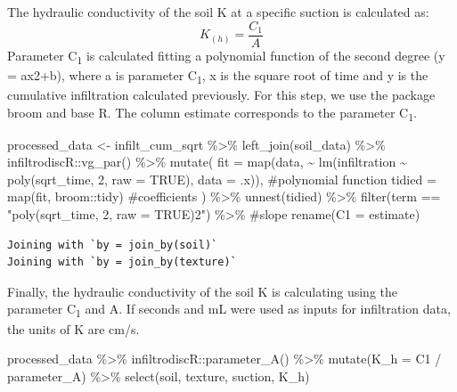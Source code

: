 \documentclass[
]{article}
\newenvironment{Shaded}{\begin{snugshade}}{\end{snugshade}}
\newcommand{\AttributeTok}[1]{\textcolor[rgb]{0.40,0.45,0.13}{#1}}
\newcommand{\CommentTok}[1]{\textcolor[rgb]{0.37,0.37,0.37}{#1}}
\newcommand{\ConstantTok}[1]{\textcolor[rgb]{0.56,0.35,0.01}{#1}}
\newcommand{\DecValTok}[1]{\textcolor[rgb]{0.68,0.00,0.00}{#1}}
\newcommand{\FunctionTok}[1]{\textcolor[rgb]{0.28,0.35,0.67}{#1}}
\newcommand{\NormalTok}[1]{\textcolor[rgb]{0.00,0.23,0.31}{#1}}
\newcommand{\OtherTok}[1]{\textcolor[rgb]{0.00,0.23,0.31}{#1}}
\newcommand{\SpecialCharTok}[1]{\textcolor[rgb]{0.37,0.37,0.37}{#1}}
\newcommand{\StringTok}[1]{\textcolor[rgb]{0.13,0.47,0.30}{#1}}
\begin{document}
The hydraulic conductivity of the soil K at a specific suction is
calculated as: \[K_{(h)} = \frac{C_{1}}{A}\] Parameter
C\textsubscript{1} is calculated fitting a polynomial function of the
second degree (y = ax2+b), where a is parameter C\textsubscript{1}, x is
the square root of time and y is the cumulative infiltration calculated
previously. For this step, we use the package broom and base R. The
column estimate corresponds to the parameter C\textsubscript{1}.

\begin{Shaded}
\begin{Highlighting}[]
\NormalTok{processed\_data }\OtherTok{\textless{}{-}} 
\NormalTok{infilt\_cum\_sqrt }\SpecialCharTok{\%\textgreater{}\%} 
  \FunctionTok{left\_join}\NormalTok{(soil\_data) }\SpecialCharTok{\%\textgreater{}\%} 
\NormalTok{  infiltrodiscR}\SpecialCharTok{::}\FunctionTok{vg\_par}\NormalTok{() }\SpecialCharTok{\%\textgreater{}\%} 
    \FunctionTok{mutate}\NormalTok{(}
    \AttributeTok{fit =} \FunctionTok{map}\NormalTok{(data,}
              \SpecialCharTok{\textasciitilde{}} \FunctionTok{lm}\NormalTok{(infiltration }\SpecialCharTok{\textasciitilde{}} \FunctionTok{poly}\NormalTok{(sqrt\_time, }\DecValTok{2}\NormalTok{, }\AttributeTok{raw =} \ConstantTok{TRUE}\NormalTok{),}
                   \AttributeTok{data =}\NormalTok{ .x)), }\CommentTok{\#polynomial function}
    \AttributeTok{tidied =} \FunctionTok{map}\NormalTok{(fit, broom}\SpecialCharTok{::}\NormalTok{tidy) }\CommentTok{\#coefficients}
\NormalTok{  ) }\SpecialCharTok{\%\textgreater{}\%} 
  \FunctionTok{unnest}\NormalTok{(tidied) }\SpecialCharTok{\%\textgreater{}\%} 
\FunctionTok{filter}\NormalTok{(term }\SpecialCharTok{==} \StringTok{"poly(sqrt\_time, 2, raw = TRUE)2"}\NormalTok{) }\SpecialCharTok{\%\textgreater{}\%} \CommentTok{\#slope}
\FunctionTok{rename}\NormalTok{(}\AttributeTok{C1 =}\NormalTok{ estimate) }
\end{Highlighting}
\end{Shaded}

\begin{verbatim}
Joining with `by = join_by(soil)`
Joining with `by = join_by(texture)`
\end{verbatim}

\newpage{}

Finally, the hydraulic conductivity of the soil K is calculating using
the parameter C\textsubscript{1} and A. If seconds and mL were used as
inputs for infiltration data, the units of K are cm/s.

\begin{Shaded}
\begin{Highlighting}[]
\NormalTok{processed\_data }\SpecialCharTok{\%\textgreater{}\%} 
\NormalTok{  infiltrodiscR}\SpecialCharTok{::}\FunctionTok{parameter\_A}\NormalTok{() }\SpecialCharTok{\%\textgreater{}\%} 
  \FunctionTok{mutate}\NormalTok{(}\AttributeTok{K\_h =}\NormalTok{ C1 }\SpecialCharTok{/}\NormalTok{ parameter\_A) }\SpecialCharTok{\%\textgreater{}\%} 
  \FunctionTok{select}\NormalTok{(soil, texture, suction, K\_h)}
\end{Highlighting}
\end{Shaded}
\end{document}
